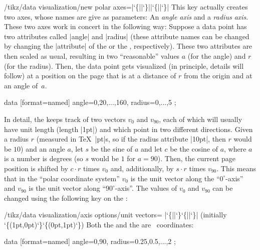 \begin{key}{/tikz/data visualization/new polar axes=|\char`\{||\char`\}||\char`\{||\char`\}|}
    This key actually creates two axes, whose names are give as parameters: An
    \emph{angle axis} and a \emph{radius axis}. These two axes work in concert
    in the following way: Suppose a data point has two attributes called
    |angle| and |radius| (these attribute names can be changed by changing the
    |attribute| of the  or the ,
    respectively). These two attributes are then scaled as usual, resulting in
    two ``reasonable'' values $a$ (for the angle) and $r$ (for the radius).
    Then, the data point gets visualized (in principle, details will follow) at
    a position on the page that is at a distance of $r$ from the origin and at
    an angle of~$a$.
\begin{codeexample}[preamble={\usetikzlibrary{datavisualization.polar}}]
\tikz \datavisualization
    [new polar axes={angle axis}{radius axis},
     radius axis={length=2cm},
     visualize as scatter]
  data [format=named] {
    angle={0,20,...,160}, radius={0,...,5}
  };
\end{codeexample}
    In detail, the  keeps track of two vectors $v_0$ and
    $v_{90}$, each of which will usually have unit length (length |1pt|) and
    which point in two different directions. Given a radius $r$ (measured in
    \TeX\ |pt|s, so if the radius attribute |10pt|, then $r$ would be $10$) and
    an angle $a$, let $s$ be the sine of $a$ and let $c$ be the cosine of $a$,
    where $a$ is a number is degrees (so $s$ would be $1$ for $a = 90$). Then,
    the current page position is shifted by $c \cdot r$ times $v_0$ and,
    additionally, by $s \cdot r$ times $v_{90}$. This means that in the ``polar
    coordinate system'' $v_0$ is the unit vector along the ``$0^\circ$-axis''
    and $v_{90}$ is the unit vector along ``$90^\circ$-axis''. The values of
    $v_0$ and $v_{90}$ can be changed using the following key on the
    :
    \begin{key}{/tikz/data visualization/axis options/unit vectors=%
            |\char`\{||\char`\}\char`\{||\char`\}|
            (initially {\char`\{(1pt,0pt)\char`\}\char`\{(0pt,1pt)\char`\}})%
    }
    Both the  and the 
    are \tikzname\ coordinates:
\begin{codeexample}[preamble={\usetikzlibrary{datavisualization.polar}}]
\tikz \datavisualization
    [new polar axes={angle axis}{radius axis},
     radius axis={unit length=1cm},
     angle axis={unit vectors={(10:1pt)}{(60:1pt)}},
     visualize as scatter]
  data [format=named] {
    angle={0,90}, radius={0.25,0.5,...,2}
  };
\end{codeexample}
    \end{key}
\end{key}

